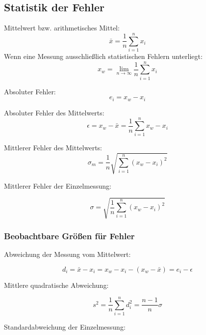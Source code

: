 \documentclass[a4paper,12pt]{report}
\newcommand{\limn}{\lim_{n \rightarrow \infty}}
\begin{document}
\subsection{Statistik der Fehler}

Mittelwert bzw. arithmetisches Mittel:
\begin{equation*}
\bar{x}=\frac{1}{n} \sum_{i=1}^n x_i
\end{equation*}
Wenn eine Messung ausschließlich statistischen Fehlern unterliegt: 
\begin{equation}
x_w = \limn \frac{1}{n}\sum_{i=1}^n x_i
\end{equation}

Absoluter Fehler: 
\begin{equation}
e_i = x_w - x_i
\end{equation}

Absoluter Fehler des Mittelwerts:
\begin{equation}
\epsilon = x_w - \bar{x} = \frac{1}{n} \sum_{i=1}^n x_w - x_i
\end{equation}

Mittlerer Fehler des Mittelwerts:
\begin{equation}
\sigma_m = \frac{1}{n} \sqrt{\sum_{i=1}^n(x_w - x_i)^2}
\end{equation}

Mittlerer Fehler der Einzelmessung:

\begin{equation}
\sigma =  \sqrt{\frac{1}{n} \sum_{i=1}^n(x_w - x_i)^2}
\end{equation}

\subsubsection{Beobachtbare Größen für Fehler}

Abweichung der Messung vom Mittelwert:

\begin{equation}
d_i = \bar{x} - x_i = x_w - x_i - (x_w - \bar{x}) = e_i - \epsilon
\end{equation}

Mittlere quadratische Abweichung:

\begin{equation}
s^2 = \frac{1}{n} \sum_{i=1}	^n d_i^2 = \frac{n-1}{n} \sigma 
\end{equation}

Standardabweichung der Einzelmessung:
\end{document}
